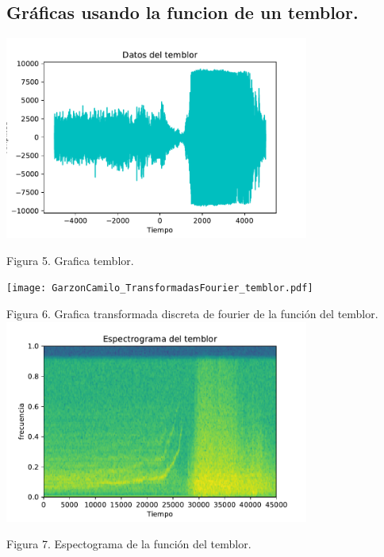 \documentclass[11pt,letterpaper]{exam}
\begin{document}
\subsection{    Gráficas usando la funcion de un temblor.} 
\vspace{5mm}
\begin{center}
\includegraphics[width=10cm]{GarzonCamilo_temblor.pdf} 

Figura 5. Grafica temblor.

\texttt{[image: GarzonCamilo\_TransformadasFourier\_temblor.pdf]} 

Figura 6. Grafica transformada discreta de fourier de la función del temblor.
\includegraphics[width=10cm]{GarzonCamilo_espectograma_temblor.pdf} 

Figura 7. Espectograma de la función del temblor.
\end{center}
\end{document}
